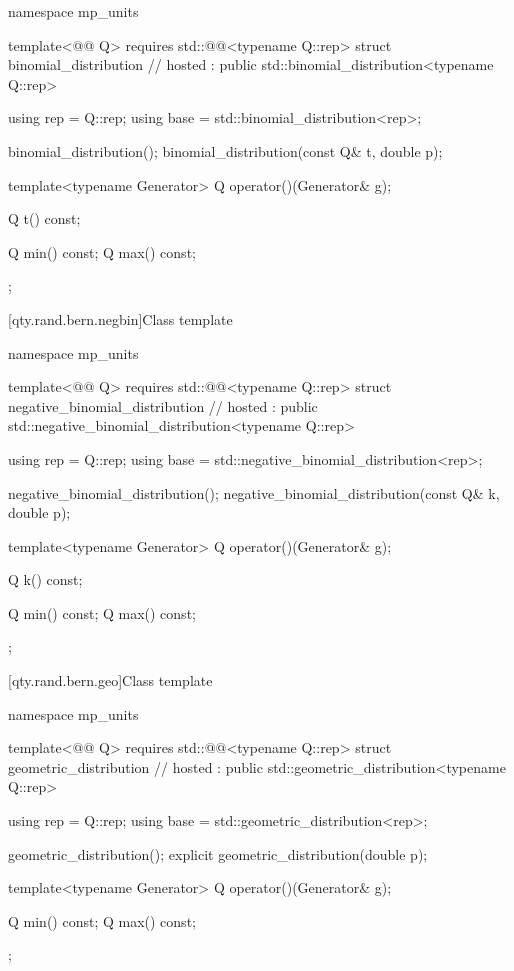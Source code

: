 \begin{codeblock}
namespace mp_units {
template<@@ Q>
  requires std::@@<typename Q::rep>
struct binomial_distribution                                                            // hosted
    : public std::binomial_distribution<typename Q::rep> {
  using rep = Q::rep;
  using base = std::binomial_distribution<rep>;

  binomial_distribution();
  binomial_distribution(const Q& t, double p);

  template<typename Generator>
  Q operator()(Generator& g);

  Q t() const;

  Q min() const;
  Q max() const;
};
}
\end{codeblock}

[qty.rand.bern.negbin]{Class template }

\begin{codeblock}
namespace mp_units {
template<@@ Q>
  requires std::@@<typename Q::rep>
struct negative_binomial_distribution                                                   // hosted
    : public std::negative_binomial_distribution<typename Q::rep> {
  using rep = Q::rep;
  using base = std::negative_binomial_distribution<rep>;

  negative_binomial_distribution();
  negative_binomial_distribution(const Q& k, double p);

  template<typename Generator>
  Q operator()(Generator& g);

  Q k() const;

  Q min() const;
  Q max() const;
};
}
\end{codeblock}

[qty.rand.bern.geo]{Class template }

\begin{codeblock}
namespace mp_units {
template<@@ Q>
  requires std::@@<typename Q::rep>
struct geometric_distribution                                                           // hosted
    : public std::geometric_distribution<typename Q::rep> {
  using rep = Q::rep;
  using base = std::geometric_distribution<rep>;

  geometric_distribution();
  explicit geometric_distribution(double p);

  template<typename Generator>
  Q operator()(Generator& g);

  Q min() const;
  Q max() const;
};
}
\end{codeblock}

